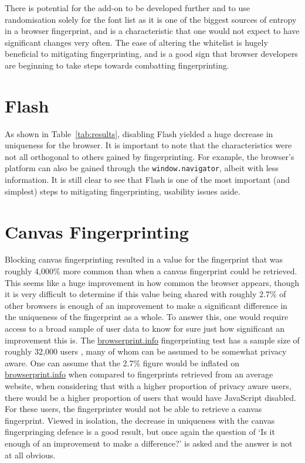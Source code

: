 There is potential for the add-on to be developed further and to use randomisation solely for the font list as it is one of the biggest sources of entropy in a browser fingerprint, and is a characteristic that one would not expect to have significant changes very often.
The ease of altering the whitelist is hugely beneficial to mitigating fingerprinting, and is a good sign that browser developers are beginning to take steps towards combatting fingerprinting.

\section{Flash}

As shown in Table~\ref{tab:results}, disabling Flash yielded a huge decrease in uniqueness for the browser.
It is important to note that the characteristics were not all orthogonal to others gained by fingerprinting.
For example, the browser's platform can also be gained through the \texttt{window.navigator}, albeit with less information.
It is still clear to see that Flash is one of the most important (and simplest) steps to mitigating fingerprinting, usability issues aside.

\section{Canvas Fingerprinting}

Blocking canvas fingerprinting resulted in a value for the fingerprint that was roughly 4,000\% more common than when a canvas fingerprint could be retrieved.
This seems like a huge improvement in how common the browser appears, though it is very difficult to determine if this value being shared with roughly 2.7\% of other browsers is enough of an improvement to make a significant difference in the uniqueness of the fingerprint as a whole.
To answer this, one would require access to a broad sample of user data to know for sure just how significant an improvement this is.
The \url{browserprint.info} fingerprinting test has a sample size of roughly 32,000 users \citep{browserprint}, many of whom can be assumed to be somewhat privacy aware.
One can assume that the 2.7\% figure would be inflated on \url{browserprint.info} when compared to fingerprints retrieved from an average website, when considering that with a higher proportion of privacy aware users, there would be a higher proportion of users that would have JavaScript disabled.
For these users, the fingerprinter would not be able to retrieve a canvas fingerprint.
Viewed in isolation, the decrease in uniqueness with the canvas fingerpringing defence is a good result, but once again the question of `Is it enough of an improvement to make a difference?' is asked and the answer is not at all obvious.

